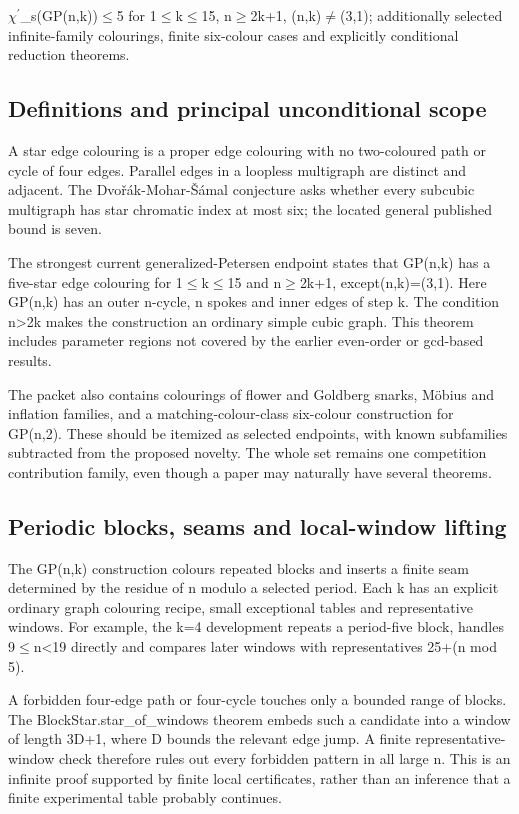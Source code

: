 \documentclass[11pt,a4paper]{article}
\begin{document}
\ensuremath{\chi}\ensuremath{^{\prime}}\_s(GP(n,k))\ensuremath{\leq}5 for 1\ensuremath{\leq}k\ensuremath{\leq}15, n\ensuremath{\geq}2k+1, (n,k)\ensuremath{\neq}(3,1); additionally selected infinite-family colourings, finite six-colour cases and explicitly conditional reduction theorems.

\subsection{Definitions and principal unconditional scope}
A star edge colouring is a proper edge colouring with no two-coloured path or cycle of four edges. Parallel edges in a loopless multigraph are distinct and adjacent. The Dvořák-Mohar-Šámal conjecture asks whether every subcubic multigraph has star chromatic index at most six; the located general published bound is seven.

The strongest current generalized-Petersen endpoint states that GP(n,k) has a five-star edge colouring for 1\ensuremath{\leq}k\ensuremath{\leq}15 and n\ensuremath{\geq}2k+1, except(n,k)=(3,1). Here GP(n,k) has an outer n-cycle, n spokes and inner edges of step k. The condition n>2k makes the construction an ordinary simple cubic graph. This theorem includes parameter regions not covered by the earlier even-order or gcd-based results.

The packet also contains colourings of flower and Goldberg snarks, Möbius and inflation families, and a matching-colour-class six-colour construction for GP(n,2). These should be itemized as selected endpoints, with known subfamilies subtracted from the proposed novelty. The whole set remains one competition contribution family, even though a paper may naturally have several theorems.

\subsection{Periodic blocks, seams and local-window lifting}
The GP(n,k) construction colours repeated blocks and inserts a finite seam determined by the residue of n modulo a selected period. Each k has an explicit ordinary graph colouring recipe, small exceptional tables and representative windows. For example, the k=4 development repeats a period-five block, handles 9\ensuremath{\leq}n<19 directly and compares later windows with representatives 25+(n mod 5).

A forbidden four-edge path or four-cycle touches only a bounded range of blocks. The BlockStar.star\_of\_windows theorem embeds such a candidate into a window of length 3D+1, where D bounds the relevant edge jump. A finite representative-window check therefore rules out every forbidden pattern in all large n. This is an infinite proof supported by finite local certificates, rather than an inference that a finite experimental table probably continues.
\end{document}
